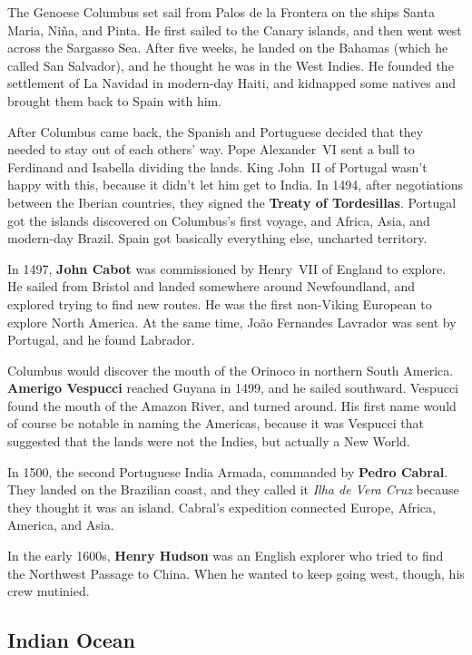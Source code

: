 The Genoese Columbus set sail from Palos de la Frontera on the ships Santa Maria, Ni\~na, and Pinta.
He first sailed to the Canary islands, and then went west across the Sargasso Sea.
After five weeks, he landed on the Bahamas (which he called San Salvador),
and he thought he was in the West Indies.
He founded the settlement of La Navidad in modern-day Haiti,
and kidnapped some natives and brought them back to Spain with him.

After Columbus came back, the Spanish and Portuguese decided that they needed to stay out of each others' way.
Pope Alexander~VI sent a bull to Ferdinand and Isabella dividing the lands.
King John~II of Portugal wasn't happy with this, because it didn't let him get to India.
In 1494, after negotiations between the Iberian countries, they signed the \textbf{Treaty of Tordesillas}.
Portugal got the islands discovered on Columbus's first voyage, and Africa, Asia, and modern-day Brazil.
Spain got basically everything else, uncharted territory.

In 1497, \textbf{John Cabot} was commissioned by Henry~VII of England to explore.
He sailed from Bristol and landed somewhere around Newfoundland, and explored trying to find new routes.
He was the first non-Viking European to explore North America.
At the same time, Jo\~ao Fernandes Lavrador was sent by Portugal, and he found Labrador.

Columbus would discover the mouth of the Orinoco in northern South America.
\textbf{Amerigo Vespucci} reached Guyana in 1499, and he sailed southward.
Vespucci found the mouth of the Amazon River, and turned around.
His first name would of course be notable in naming the Americas,
because it was Vespucci that suggested that the lands were not the Indies, but actually a New World.

In 1500, the second Portuguese India Armada, commanded by \textbf{Pedro Cabral}.
They landed on the Brazilian coast,
and they called it \textit{Ilha de Vera Cruz} because they thought it was an island.
Cabral's expedition connected Europe, Africa, America, and Asia.

In the early 1600s, \textbf{Henry Hudson} was an English explorer who tried to find the Northwest Passage to China.
When he wanted to keep going west, though, his crew mutinied.


\subsection*{Indian Ocean}

